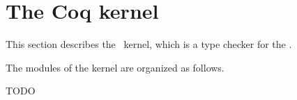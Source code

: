 
\section*{The Coq kernel}

\ocwsection 
This section describes the \Coq\ kernel, which is a type checker for the \CCI.

The modules of the kernel are organized as follows.

TODO
